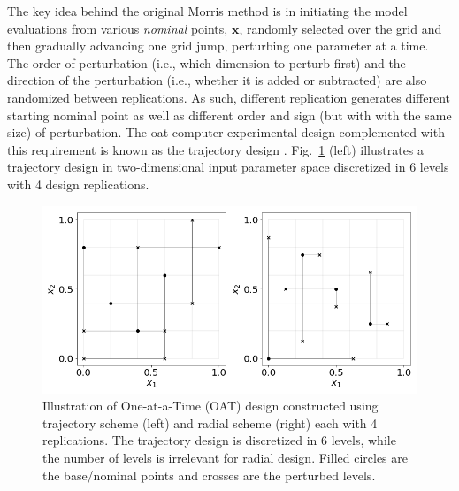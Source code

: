 The key idea behind the original Morris method is in initiating the model evaluations from various \textit{nominal} points, $\mathbf{x}$,
randomly selected over the grid and then gradually advancing one grid jump, perturbing one parameter at a time.
The order of perturbation (i.e., which dimension to perturb first) and the direction of the perturbation (i.e., whether it is added or subtracted) are also randomized between replications.
As such, different replication generates different starting nominal point as well as different order and sign (but with with the same size) of perturbation.
The \gls{oat} computer experimental design complemented with this requirement is known as the trajectory design \cite{Ruano2012}.
Fig.~\ref{fig:illustrate_oat_design} (left) illustrates a trajectory design in two-dimensional input parameter space discretized in $6$ levels with 4 design replications.
\begin{figure}[bth]
	\centering
	\includegraphics[width=1.0\textwidth]{../figures/illustrateOATDesign/illustrateOATDesign.png}
	\caption[Illustration of One-at-a-Time (OAT) design using trajectory and radial schemes]{Illustration of One-at-a-Time (OAT) design constructed using trajectory scheme (left) and radial scheme (right) each with 4 replications. The trajectory design is discretized in 6 levels, while the number of levels is irrelevant for radial design. Filled circles are the base/nominal points and crosses are the perturbed levels.}
	\label{fig:illustrate_oat_design}
\end{figure}

